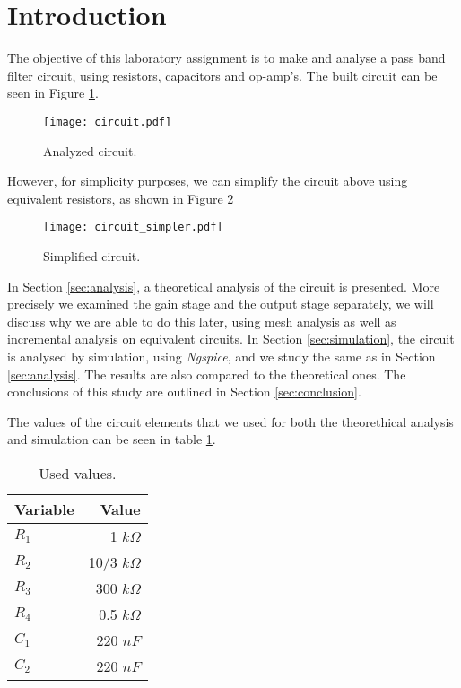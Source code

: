 \section{Introduction}
\label{sec:introduction}

The objective of this laboratory assignment is to make and analyse a pass band filter circuit, using resistors, capacitors and op-amp's. The built circuit can be seen in Figure \ref{fig:cir_intro}.

\begin{figure}[H] \centering
\texttt{[image: circuit.pdf]}
\caption{Analyzed circuit.}
\label{fig:cir_intro}
\end{figure}

However, for simplicity purposes, we can simplify the circuit above using equivalent resistors, as shown in Figure \ref{fig:cir_simpler}

\begin{figure}[H] \centering
\texttt{[image: circuit\_simpler.pdf]}
\caption{Simplified circuit.}
\label{fig:cir_simpler}
\end{figure}

In Section \ref{sec:analysis}, a theoretical analysis of the circuit is
presented. More precisely we examined the gain stage and the output stage separately, we will discuss why we are able to do this later, using mesh analysis as well as incremental analysis on equivalent circuits.
In Section \ref{sec:simulation}, the circuit is analysed by simulation, using \textit{Ngspice}, and we study the same as in Section \ref{sec:analysis}. The results are also compared to the theoretical ones. The conclusions of this study are outlined in Section \ref{sec:conclusion}.
\par
The values of the circuit elements that we used for both the theorethical analysis and simulation can be seen in table \ref{tab:intro_values}.

\begin{table}[H]
  \centering
  \begin{tabular}{|l|r|}
    \hline
        {\bf Variable} & {\bf Value} \\ \hline
        $R_1$ & 1 $k\Omega$ \\ \hline
        $R_2$ & 10/3 $k\Omega$ \\ \hline
        $R_3$ & 300 $k\Omega$ \\ \hline
        $R_4$ & 0.5 $k\Omega$ \\ \hline
        $C_1$ & 220 $nF$ \\ \hline
        $C_2$ & 220 $nF$ \\ \hline
  \end{tabular}
  \caption{Used values.}
  \label{tab:intro_values}
\end{table}
